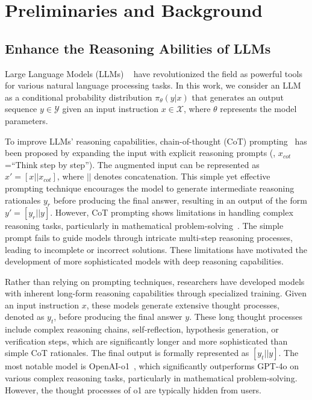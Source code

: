 
\section{Preliminaries and Background}

\subsection{Enhance the Reasoning Abilities of LLMs}
Large Language Models (LLMs) ~\cite{LLMSurvey,chang2024survey} have revolutionized the field as powerful tools for various natural language processing tasks. In this work, we consider an LLM as a conditional probability distribution $\pi_\theta(y|x)$ that generates an output sequence $y \in \mathcal{Y}$ given an input instruction $x \in \mathcal{X}$, where $\theta$ represents the model parameters. 



To improve LLMs' reasoning capabilities, chain-of-thought (CoT) prompting~\cite{wei2022cot} has been proposed by expanding the input with explicit reasoning prompts (\eg, $x_{cot}$=``Think step by step''). The augmented input can be represented as $x'=[x || x_{cot}]$, where $||$ denotes concatenation. This simple yet effective prompting technique encourages the model to generate intermediate reasoning rationales $y_r$ before producing the final answer, resulting in an output of the form $y' = [y_r || y]$. 
However,  CoT prompting shows limitations in handling complex reasoning tasks, particularly in mathematical problem-solving~\cite{yao2024tree}. The simple prompt fails to guide models through intricate multi-step reasoning processes, leading to incomplete or incorrect solutions. These limitations have motivated the development of more sophisticated models with deep reasoning capabilities.

Rather than relying on prompting techniques, researchers have developed models with inherent long-form reasoning capabilities through specialized training.  
Given an input instruction $x$, these models generate extensive thought processes, denoted as $y_t$, before producing the final answer $y$. These long thought processes include complex reasoning chains, self-reflection, hypothesis generation, or verification steps, which are significantly longer and more sophisticated than simple CoT rationales. The final output is formally represented as $[y_t || y]$.
The most notable model is {OpenAI-o1}~\cite{o1}, which significantly outperforms GPT-4o on various complex reasoning tasks, particularly in mathematical problem-solving.
However, the thought processes of {o1} are typically hidden from users. 


